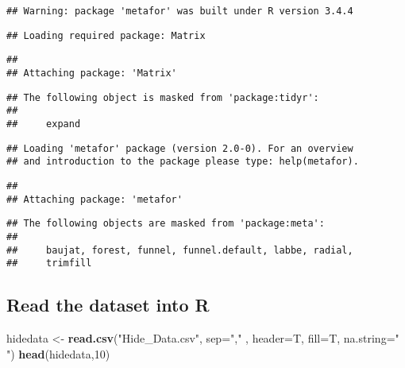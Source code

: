 \documentclass[]{article}
\newenvironment{Shaded}{\begin{snugshade}}{\end{snugshade}}
\newcommand{\KeywordTok}[1]{\textcolor[rgb]{0.13,0.29,0.53}{\textbf{#1}}}
\newcommand{\DataTypeTok}[1]{\textcolor[rgb]{0.13,0.29,0.53}{#1}}
\newcommand{\DecValTok}[1]{\textcolor[rgb]{0.00,0.00,0.81}{#1}}
\newcommand{\StringTok}[1]{\textcolor[rgb]{0.31,0.60,0.02}{#1}}
\newcommand{\NormalTok}[1]{#1}
\begin{document}
\begin{verbatim}
## Warning: package 'metafor' was built under R version 3.4.4
\end{verbatim}

\begin{verbatim}
## Loading required package: Matrix
\end{verbatim}

\begin{verbatim}
## 
## Attaching package: 'Matrix'
\end{verbatim}

\begin{verbatim}
## The following object is masked from 'package:tidyr':
## 
##     expand
\end{verbatim}

\begin{verbatim}
## Loading 'metafor' package (version 2.0-0). For an overview 
## and introduction to the package please type: help(metafor).
\end{verbatim}

\begin{verbatim}
## 
## Attaching package: 'metafor'
\end{verbatim}

\begin{verbatim}
## The following objects are masked from 'package:meta':
## 
##     baujat, forest, funnel, funnel.default, labbe, radial,
##     trimfill
\end{verbatim}

\subsection{Read the dataset into R}\label{read-the-dataset-into-r}

\begin{Shaded}
\begin{Highlighting}[]
\NormalTok{hidedata <-}\StringTok{ }\KeywordTok{read.csv}\NormalTok{(}\StringTok{"Hide_Data.csv"}\NormalTok{, }\DataTypeTok{sep=}\StringTok{","}\NormalTok{ , }\DataTypeTok{header=}\NormalTok{T, }\DataTypeTok{fill=}\NormalTok{T, }\DataTypeTok{na.string=}\StringTok{" "}\NormalTok{)}
\KeywordTok{head}\NormalTok{(hidedata,}\DecValTok{10}\NormalTok{)}
\end{Highlighting}
\end{Shaded}
\end{document}
